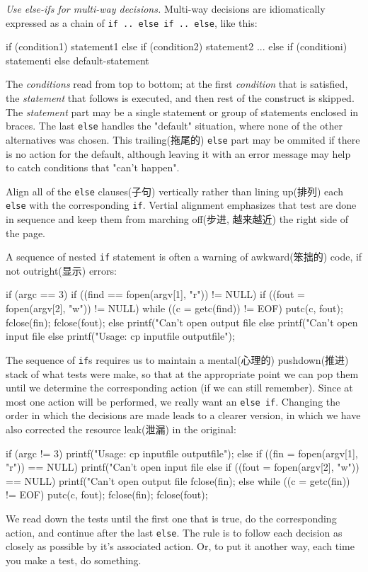 \emph{Use else-ifs for multi-way decisions.} Multi-way decisions are
idiomatically expressed as a chain of \verb'if .. else if .. else', like this:
\begin{wellcode}
    if (condition1)
        statement1
    else if (condition2)
        statement2
    ...
    else if (conditioni)
        statementi
    else 
        default-statement
\end{wellcode}
The \textit{conditions} read from top to bottom; at the first
\textit{condition} that is satisfied, the \textit{statement} that follows
is executed, and then rest of the construct is skipped. The
\textit{statement} part may be a single statement or group of statements
enclosed in braces. The last \verb'else' handles the "default" situation,
where none of the other alternatives was chosen. This trailing(拖尾的)
\verb'else' part may be ommited if there is no action for the default,
although leaving it with an error message may help to catch conditions that
"can't happen".

Align all of the \verb'else' clauses(子句) vertically rather than lining
up(排列) each \verb'else' with the corresponding \verb'if'. Vertial
alignment emphasizes that test are done in sequence and keep them from
marching off(步进, 越来越近) the right side of the page.

A sequence of nested \verb'if' statement is often a warning of
awkward(笨拙的) code, if not outright(显示) errors:
\begin{badcode}
    if (argc == 3)
        if ((find == fopen(argv[1], "r")) != NULL)
            if ((fout = fopen(argv[2], "w")) != NULL) {
                while ((c = getc(find)) != EOF)
                    putc(c, fout);
                fclose(fin); fclose(fout);
            } else 
                printf("Can't open output file %
        else 
            printf("Can't open input file %
    else 
        printf("Usage: cp inputfile outputfile\n");
\end{badcode}
The sequence of \verb'if's requires us to maintain a mental(心理的)
pushdown(推进) stack of what tests were make, so that at the appropriate
point we can pop them until we determine the corresponding action (if we
can still remember). Since at most one action will be performed, we really
want an \verb'else if'. Changing the order in which the decisions are made
leads to a clearer version, in which we have also corrected the resource
leak(泄漏) in the original:
\begin{wellcode}
    if (argc != 3)
        printf("Usage: cp inputfile outputfile\n");
    else if ((fin = fopen(argv[1], "r")) == NULL)
        printf("Can't open input file %
    else if ((fout = fopen(argv[2], "w")) == NULL) {
        printf("Can't open output file %
        fclose(fin);
    } else {
        while ((c = getc(fin)) != EOF)
            putc(c, fout);
        fclose(fin);
        fclose(fout);
    }
\end{wellcode}
We read down the tests until the first one that is true, do the
corresponding action, and continue after the last \verb'else'. The rule is
to follow each decision as closely as possible by it's associated action.
Or, to put it another way, each time you make a test, do something.

